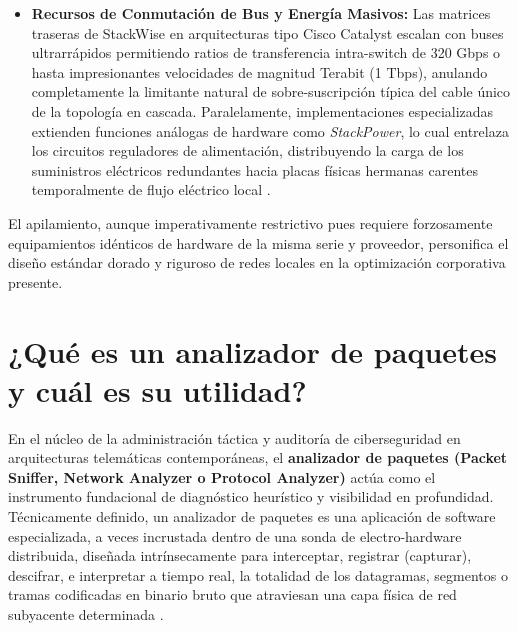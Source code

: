\documentclass[a4paper,12pt]{article}
\begin{document}
\begin{itemize}
    \item \textbf{Recursos de Conmutación de Bus y Energía Masivos:} Las matrices traseras de StackWise en arquitecturas tipo Cisco Catalyst escalan con buses ultrarrápidos permitiendo ratios de transferencia intra-switch de 320 Gbps o hasta impresionantes velocidades de magnitud Terabit (1 Tbps), anulando completamente la limitante natural de sobre-suscripción típica del cable único de la topología en cascada. Paralelamente, implementaciones especializadas extienden funciones análogas de hardware como \textit{StackPower}, lo cual entrelaza los circuitos reguladores de alimentación, distribuyendo la carga de los suministros eléctricos redundantes hacia placas físicas hermanas carentes temporalmente de flujo eléctrico local \cite{stallings2014}.
\end{itemize}

El apilamiento, aunque imperativamente restrictivo pues requiere forzosamente equipamientos idénticos de hardware de la misma serie y proveedor, personifica el diseño estándar dorado y riguroso de redes locales en la optimización corporativa presente.


\newpage

\section{¿Qué es un analizador de paquetes y cuál es su utilidad?}

En el núcleo de la administración táctica y auditoría de ciberseguridad en arquitecturas telemáticas contemporáneas, el \textbf{analizador de paquetes (Packet Sniffer, Network Analyzer o Protocol Analyzer)} actúa como el instrumento fundacional de diagnóstico heurístico y visibilidad en profundidad. Técnicamente definido, un analizador de paquetes es una aplicación de software especializada, a veces incrustada dentro de una sonda de electro-hardware distribuida, diseñada intrínsecamente para interceptar, registrar (capturar), descifrar, e interpretar a tiempo real, la totalidad de los datagramas, segmentos o tramas codificadas en binario bruto que atraviesan una capa física de red subyacente determinada \cite{kurose2017}.
\end{document}
